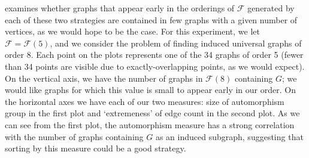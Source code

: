\documentclass[12pt]{article}
\newcommand{\calF}{\ensuremath{\mathcal{F}}}
\begin{document}
 examines whether graphs that appear early in the orderings
of $\calF$
generated by each of these two strategies are contained in few graphs with
a given number of vertices, as we would hope to be the case.
For this experiment, we let $\calF = \calF(5)$, and we consider the problem
of finding induced universal graphs of order 8.
Each point on the plots
represents one of the 34 graphs of order 5 (fewer than 34 points are visible
due to exactly-overlapping points, as we would expect).  On the vertical
axis, we have the number of graphs in $\calF(8)$ containing $G$; we would like
graphs for which this value is small to appear early in our order.
On the horizontal axes we have each of our two measures: size of automorphism group
in the first plot and `extremeness' of edge count in the second plot.
As we can see from the first plot, the automorphism measure has a strong correlation
with the number of graphs containing $G$ as an induced subgraph, suggesting that
sorting by this measure could be a good strategy.
\end{document}
